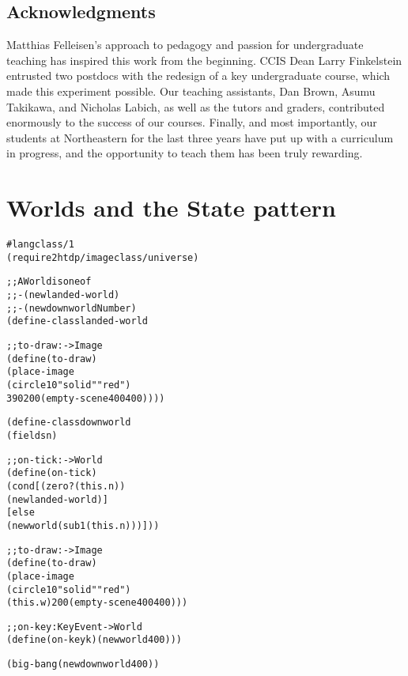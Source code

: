 \documentclass[submission,copyright]{eptcs}
\begin{document}
\subsection*{Acknowledgments}

Matthias Felleisen's approach to pedagogy and passion for
undergraduate teaching has inspired this work from the beginning.
CCIS Dean Larry Finkelstein entrusted two postdocs with the redesign
of a key undergraduate course, which made this experiment possible.
Our teaching assistants, Dan Brown, Asumu Takikawa, and Nicholas
Labich, as well as the tutors and graders, contributed enormously to
the success of our courses. Finally, and most importantly, our
students at Northeastern for the last three years have put up with a
curriculum in progress, and the opportunity to teach them has been
truly rewarding.




\appendix
\section{Worlds and the State pattern}
\label{sec:appendix}

\begin{alltt}
#lang class/1
(require 2htdp/image class/universe)

;; A World is one of 
;; - (new landed-world)
;; - (new downworld Number)
(define-class landed-world

  ;; to-draw : -> Image
  (define (to-draw) 
    (place-image 
     (circle 10 "solid" "red")
     390 200 (empty-scene 400 400))))

(define-class downworld
  (fields n)

  ;; on-tick : -> World
  (define (on-tick)
    (cond [(zero? (this . n))
           (new landed-world)]
          [else
           (new world (sub1 (this . n)))]))

  ;; to-draw : -> Image
  (define (to-draw) 
    (place-image 
     (circle 10 "solid" "red")
     (this . w) 200 (empty-scene 400 400)))

  ;; on-key : KeyEvent -> World
  (define (on-key k) (new world 400)))
  
(big-bang (new downworld 400))
\end{alltt}
\end{document}
